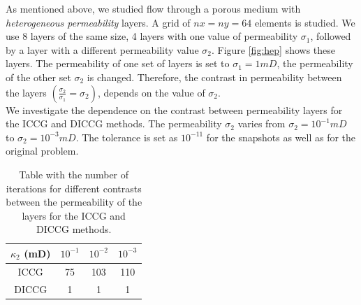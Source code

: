 \documentclass[12pt]{article}
\begin{document}
\normalsize
As mentioned above, we studied flow through a porous medium with \emph{heterogeneous permeability} layers. A grid of
$nx = ny = 64$ elements is studied. We use 8 layers of the same size, 
4 layers with one value of permeability $\sigma_1$, followed by a layer with a different permeability value $\sigma_2$. Figure \ref{fig:hep} shows these layers. The permeability of one set of layers is set to $\sigma_1=1mD$, the permeability of the other set $\sigma_2$ is changed. 
Therefore, the contrast in permeability between the layers $(\frac{\sigma_2}{\sigma_1}=\sigma_2)$,
depends on the value of $\sigma_2$.\\
We investigate the dependence on the contrast between permeability layers for the ICCG and DICCG methods.
The permeability  $\sigma_2$ varies from $\sigma_2=10^{-1}mD$ to $\sigma_2=10^{-3}mD$. 
 The tolerance is set as $10^{-11}$ for the snapshots as well as for the original problem.\\
\renewcommand{\arraystretch}{1.3}
\begin{table}[!ht]
\centering
\begin{minipage}{.65\textwidth}
\vspace{-20pt}
\centering
\begin{tabular}{ |c|c|c|c|} 
\hline
 $\kappa_2$ (mD) & $10^{-1}$& $10^{-2}$ & $10^{-3}$ \\
 \hline
  ICCG  & 75& 103&110\\ 
 
  DICCG  & 1 & 1& 1\\ 
 \hline
\end{tabular}
\caption{Table with the number of iterations for different contrasts between the permeability of the layers
for the ICCG and DICCG methods.}
\label{table:hei}
\end{minipage}
\vspace{-10pt}
\end{table}
\end{document}
